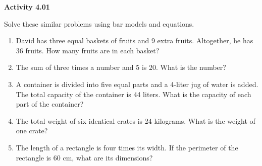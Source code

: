 \vspace{0.3ex}
\noindent\textbf{Activity 4.01}

\vspace{0.2ex}

Solve these similar problems using bar models and equations. 

\begin{enumerate}
    \item David has three equal baskets of fruits and 9 extra fruits. Altogether, he has 36 fruits. How many fruits are in each basket?  
    \item The sum of three times a number and 5 is 20. What is the number?  
    \item A container is divided into five equal parts and a 4-liter jug of water is added. The total capacity of the container is 44 liters. What is the capacity of each part of the container?  
    \item The total weight of six identical crates is 24 kilograms. What is the weight of one crate?  
    \item The length of a rectangle is four times its width. If the perimeter of the rectangle is 60 cm, what are its dimensions?  
\end{enumerate}
